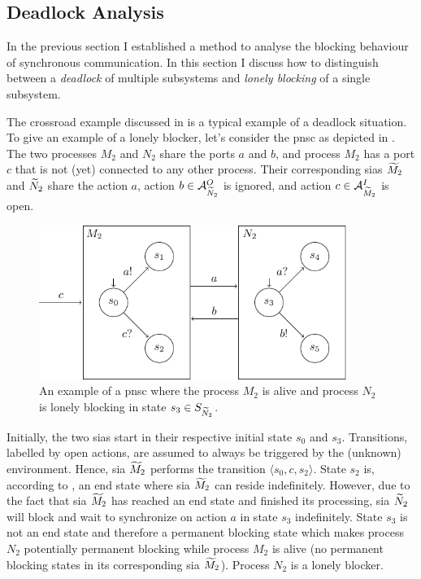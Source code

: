 \subsection{Deadlock Analysis}
\label{sect_block_dl}
In the previous section I established a method to analyse the blocking behaviour of synchronous communication.
In this section I discuss how to distinguish between a \emph{deadlock} of multiple subsystems and \emph{lonely blocking} of a single subsystem.

The crossroad example discussed in \Sect{\ref{sect_ecm_example}} is a typical example of a deadlock situation.
To give an example of a lonely blocker, let's consider the \gls{pnsc} as depicted in \Fig{\ref{fig_sia_lb}}.
The two processes $M_2$ and $N_2$ share the ports $a$ and $b$, and process $M_2$ has a port $c$ that is not (yet) connected to any other process.
Their corresponding \glspl{sia} $\widetilde{M}_2$ and $\widetilde{N}_2$ share the action $a$, action $b \in \mathcal{A}_{\widetilde{N}_2}^O$ is ignored, and action $c \in \mathcal{A}_{\widetilde{M}_2}^I$ is open.
\begin{figure}[bht]
    \TopFigSpace
    \centering
    \includegraphics[width=10cm]{fig/sia_lb.pdf}
    \CaptionFigSpace
    \caption{An example of a \gls{pnsc} where the process $M_2$ is alive and process $N_2$ is lonely blocking in state $s_3 \in S_{\widetilde{N}_2}$.}
    \label{fig_sia_lb}
    \BotFigSpace
\end{figure}

Initially, the two \glspl{sia} start in their respective initial state $s_0$ and $s_3$.
Transitions, labelled by open actions, are assumed to always be triggered by the (unknown) environment.
Hence, \gls{sia} $\widetilde{M}_2$ performs the transition $\langle s_0, c, s_2 \rangle$.
State $s_2$ is, according to \Equ{\ref{eq_sia_end}}, an end state where \gls{sia} $\widetilde{M}_2$ can reside indefinitely.
However, due to the fact that \gls{sia} $\widetilde{M}_2$ has reached an end state and finished its processing, \gls{sia} $\widetilde{N}_2$ will block and wait to synchronize on action $a$ in state $s_3$ indefinitely.
State $s_3$ is not an end state and therefore a permanent blocking state which makes process $N_2$ potentially permanent blocking while process $M_2$ is alive (no permanent blocking states in its corresponding \gls{sia} $\widetilde{M}_2$).
Process $N_2$ is a lonely blocker.

